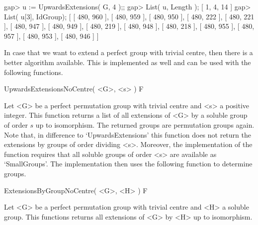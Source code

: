 gap> u := UpwardsExtensions( G, 4 );;
gap> List( u, Length );
[ 1, 4, 14 ]
gap> List( u[3], IdGroup);
[ [ 480, 960 ], [ 480, 959 ], [ 480, 950 ], [ 480, 222 ], [ 480, 221 ], 
  [ 480, 947 ], [ 480, 949 ], [ 480, 219 ], [ 480, 948 ], [ 480, 218 ], 
  [ 480, 955 ], [ 480, 957 ], [ 480, 953 ], [ 480, 946 ] ]
\endexample

In case that we want to extend a perfect group with trivial
centre, then there is a better algorithm available. This is
implemented as well and can be used with the following functions.

\> UpwardsExtensionsNoCentre( <G>, <s> ) F

Let <G> be a perfect permutation group with trivial centre and <s>
a positive integer. This function returns a list of all extensions
of <G> by a soluble group of order $s$ up to isomorphism. The returned
groups are permutation groups again. Note that, in difference to
`UpwardsExtensions' this function does not return the extensions by
groups of order dividing <s>. Moreover, the implementation of the
function requires that all soluble groups of order <s> are available
as `SmallGroups'. The implementation then uses the following function
to determine groups.

\> ExtensionsByGroupNoCentre( <G>, <H> ) F

Let <G> be a perfect permutation group with trivial centre and <H> a soluble
group. This functions returns all extensions of <G> by <H> up to isomorphism.
